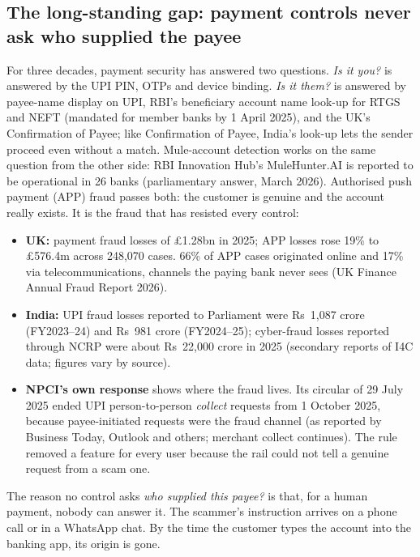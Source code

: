 \documentclass[10pt,a4paper]{article}
\newcommand{\Rs}{Rs~}
\begin{document}
\subsection{The long-standing gap: payment controls never ask who supplied the payee}
For three decades, payment security has answered two questions. \emph{Is it you?} is answered by the UPI PIN, OTPs and device
binding. \emph{Is it them?} is answered by payee-name display on UPI, RBI's beneficiary account name look-up for RTGS and
NEFT (mandated for member banks by 1 April 2025), and the UK's Confirmation of Payee; like Confirmation of Payee, India's
look-up lets the sender proceed even without a match. Mule-account detection works on the same question from the other
side: RBI Innovation Hub's MuleHunter.AI is reported to be operational in 26 banks (parliamentary answer, March 2026). Authorised push payment
(APP) fraud passes both: the customer is genuine and the account really exists. It is the fraud that has resisted every
control:
\begin{itemize}
\item \textbf{UK:} payment fraud losses of \pounds1.28bn in 2025; APP losses rose 19\% to \pounds576.4m across 248,070 cases.
66\% of APP cases originated online and 17\% via telecommunications, channels the paying bank never sees (UK Finance
Annual Fraud Report 2026).
\item \textbf{India:} UPI fraud losses reported to Parliament were \Rs1,087 crore (FY2023--24) and \Rs981 crore (FY2024--25);
cyber-fraud losses reported through NCRP were about \Rs22,000 crore in 2025 (secondary reports of I4C data; figures vary
by source).
\item \textbf{NPCI's own response} shows where the fraud lives. Its circular of 29 July 2025 ended UPI person-to-person
\emph{collect} requests from 1 October 2025, because payee-initiated requests were the fraud channel (as reported by
Business Today, Outlook and others; merchant collect continues). The rule removed a feature for every user because the
rail could not tell a genuine request from a scam one.
\end{itemize}
The reason no control asks \emph{who supplied this payee?} is that, for a human payment, nobody can answer it. The scammer's
instruction arrives on a phone call or in a WhatsApp chat. By the time the customer types the account into the banking app,
its origin is gone.
\end{document}

